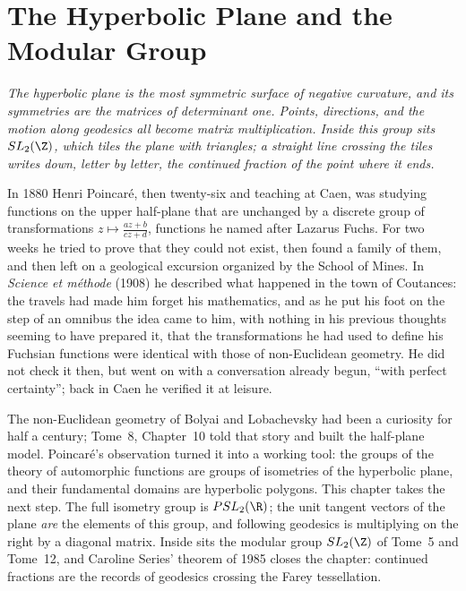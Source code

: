 \chapter{The Hyperbolic Plane and the Modular Group}

\begin{center}\itshape
The hyperbolic plane is the most symmetric surface of negative curvature, and its symmetries are the matrices of determinant one. Points, directions,
and the motion along geodesics all become matrix multiplication. Inside this group sits $SL_2(\Z)$, which tiles the plane with triangles; a straight line
crossing the tiles writes down, letter by letter, the continued fraction of the point where it ends.
\end{center}

In 1880 Henri Poincaré, then twenty-six and teaching at Caen, was studying functions on the upper half-plane that are unchanged by a discrete group of
transformations $z\mapsto\frac{az+b}{cz+d}$, functions he named after Lazarus Fuchs. For two weeks he tried to prove that they could not exist, then found a family of
them, and then left on a geological excursion organized by the School of Mines. In \emph{Science et méthode} (1908) he described what happened in the
town of Coutances: the travels had made him forget his mathematics, and as he put his foot on the step of an omnibus the idea came to him, with nothing in
his previous thoughts seeming to have prepared it, that the transformations he had used to define his Fuchsian functions were identical with those of
non-Euclidean geometry. He did not check it then, but went on with a conversation already begun, ``with perfect certainty''; back in Caen he verified it at
leisure.

The non-Euclidean geometry of Bolyai and Lobachevsky had been a curiosity for half a century; Tome~8, Chapter~10 told that story and built the
half-plane model. Poincaré's observation turned it into a working tool: the groups of the theory of automorphic functions are groups of isometries of the
hyperbolic plane, and their fundamental domains are hyperbolic polygons. This chapter takes the next step. The full isometry group is $PSL_2(\R)$; the
unit tangent vectors of the plane \emph{are} the elements of this group, and following geodesics is multiplying on the right by a diagonal matrix. Inside sits the
modular group $SL_2(\Z)$ of Tome~5 and Tome~12, and Caroline Series' theorem of 1985 closes the chapter: continued fractions are the records of
geodesics crossing the Farey tessellation.

